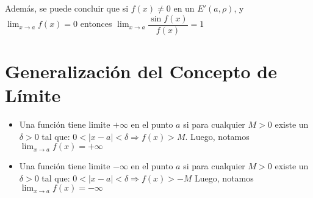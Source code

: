 \documentclass[11pt,a4paper]{article}
\begin{document}
\noindent Adem\'as, se puede concluir que si $f(x) \not = 0$ en un $E'(a, \rho)$, y $\displaystyle{\lim_{x \to a} f(x) = 0}$ entonces $\displaystyle{\lim_{x \to a} \dfrac{\sin f(x)}{f(x)} = 1}$

\section{Generalizaci\'on del Concepto de L\'imite}
\begin{itemize}
\item Una funci\'on tiene limite $+\infty$ en el punto $a$ si para cualquier $M>0$ existe un $\delta>0$ tal que: $0<|x-a|<\delta \Rightarrow f(x)>M$. Luego, notamos $\displaystyle{\lim_{x \to a} f(x) = +\infty}$
\item Una funci\'on tiene limite $-\infty$ en el punto $a$ si para cualquier $M>0$ existe un $\delta>0$ tal que: $0<|x-a|<\delta \Rightarrow f(x)>-M$ Luego, notamos $\displaystyle{\lim_{x \to a} f(x) = -\infty}$
\end{itemize}
\end{document}
